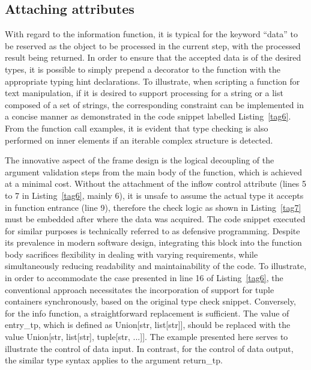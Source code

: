 \documentclass[a4paper,12pt]{article}
\newcommand{\mycite}[1]{{\color{black}\cite{#1}}}
\newcommand{\mycode}[1]{{\color{black}Listing~\ref{#1}}}
\newcommand{\inlinecode}[1]{{\ttfamily\footnotesize{#1}}}
\begin{document}
\subsection*{Attaching attributes}

With regard to the information function, it is typical for the keyword ``data'' to be reserved as the object to be processed in the current step, with the processed result being returned. In order to ensure that the accepted data is of the desired types, it is possible to simply prepend a decorator to the function with the appropriate typing hint declarations. To illustrate, when scripting a function for text manipulation, if it is desired to support processing for a string or a list composed of a set of strings, the corresponding constraint can be implemented in a concise manner as demonstrated in the code snippet labelled \mycode{tag6}. From the function call examples, it is evident that type checking is also performed on inner elements if an iterable complex structure is detected.\par



The innovative aspect of the frame design is the logical decoupling of the argument validation steps from the main body of the function, which is achieved at a minimal cost. Without the attachment of the inflow control attribute (lines 5 to 7 in \mycode{tag6}, mainly 6), it is unsafe to assume the actual type it accepts in function entrance (line 9), therefore the check logic as shown in \mycode{tag7} must be embedded after where the data was acquired. The code snippet executed for similar purposes is technically referred to as defensive programming\mycite{BOULANGER2016125}. Despite its prevalence in modern software design, integrating this block into the function body sacrifices flexibility in dealing with varying requirements, while simultaneously reducing readability and maintainability of the code. To illustrate, in order to accommodate the case presented in line 16 of \mycode{tag6}, the conventional approach necessitates the incorporation of support for tuple containers synchronously, based on the original type check snippet. Conversely, for the info function, a straightforward replacement is sufficient. The value of \inlinecode{entry\_tp}, which is defined as \inlinecode{Union[str, list[str]]}, should be replaced with the value \inlinecode{Union[str, list[str], tuple[str, ...]]}. The example presented here serves to illustrate the control of data input. In contrast, for the control of data output, the similar type syntax applies to the argument \inlinecode{return\_tp}.\par
\end{document}
